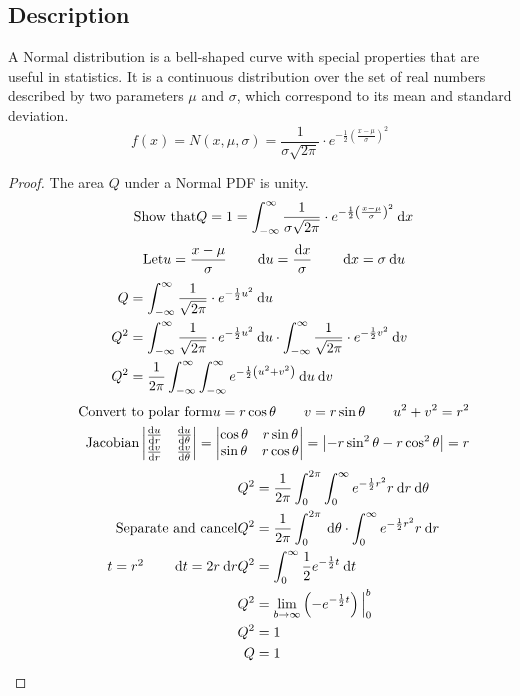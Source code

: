 \documentclass[11pt,leqno,letterpaper]{article}
\begin{document}
\subsection{Description}
A Normal distribution is a bell-shaped curve
with special properties that are useful in statistics.
It is a continuous distribution over the set of real numbers
described by two parameters $\mu$ and $\sigma$, which
correspond to its mean and standard deviation.
\[
\tag{PDF}
f(x) = 
N(x,\mu ,\sigma) = \frac{1}{\sigma \sqrt{2 \pi}} \cdot
e^{-\frac{1}{2}\left(\frac{x - \mu}{\sigma}\right)^2}
\]
\begin{proof}
The area $Q$ under a Normal PDF is unity.
\[
\tag*{Show that}
Q = 1 =
\int_{-\infty}^{\infty} \frac{1}{\sigma \sqrt{2 \pi}} \cdot
e^{-\frac{1}{2}\left(\frac{x - \mu}{\sigma}\right)^2} \:\mathrm{d}x
\]
\[
\tag*{Let}
u=\frac{x-\mu}{\sigma} \qquad
\:\mathrm{d}u = \frac{\!\:\mathrm{d}x}{\sigma} \qquad \:\mathrm{d}x = \sigma \:\mathrm{d}u
\]
\begin{align*}
Q &= \int_{-\infty}^{\infty} \frac{1}{\sqrt{2\pi}} \cdot
e^{-\frac{1}{2}u^2} \:\mathrm{d}u \\
Q^2 &= \int_{-\infty}^{\infty} \frac{1}{\sqrt{2\pi}} \cdot
e^{-\frac{1}{2}u^2} \:\mathrm{d}u \cdot
\int_{-\infty}^{\infty} \frac{1}{\sqrt{2\pi}} \cdot
e^{-\frac{1}{2}v^2} \:\mathrm{d}v \\
Q^2 &= \frac{1}{2\pi} \int_{-\infty}^{\infty} \int_{-\infty}^{\infty}
e^{-\frac{1}{2}\left(u^2 + v^2 \right)} \:\mathrm{d}u \:\mathrm{d}v
\end{align*}
\begin{align*}
\tag*{Convert to polar form}
u = r \cos \theta \qquad v = r \sin \theta \qquad
u^2+v^2=r^2 \\
\tag*{Jacobian}
\begin{vmatrix}
\frac{\mathrm{d}u}{\mathrm{d}r}&\frac{\mathrm{d}u}{\mathrm{d}\theta}\\
\frac{\mathrm{d}v}{\mathrm{d}r}&\frac{\mathrm{d}v}{\mathrm{d}\theta}
\end{vmatrix} =
\begin{vmatrix}
\cos \theta & r \sin \theta \\
\sin \theta & r \cos \theta
\end{vmatrix} =
\left|-r\sin^2\theta-r\cos^2\theta\right| = r
\end{align*}
\begin{align*}
Q^2 &= \frac{1}{2\pi} \int_{0}^{2\pi} \int_{0}^{\infty}
e^{-\frac{1}{2}r^2} r \dr \dth \\
\tag*{Separate and cancel}
Q^2 &= \frac{1}{2\pi} \int_{0}^{2\pi} \dth \cdot
\int_{0}^{\infty} e^{-\frac{1}{2}r^2} r \dr \\
\tag*{$t=r^2 \qquad \dt= 2r \dr$}
Q^2 &= \int_{0}^{\infty} \frac{1}{2} e^{-\frac{1}{2}t} \dt \\
Q^2 &= \lim_{b\to \infty} \left(-e^{-\frac{1}{2}t}\right)\Big|_0^b \\
Q^2 &= 1 \\ Q&=1 \qedhere
\end{align*}
\end{proof}
\end{document}

